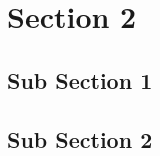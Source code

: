 \FloatBarrier
\section{Section 2}
\subsection{Sub Section 1}
\blindtext

\subsection{Sub Section 2}
\blindtext